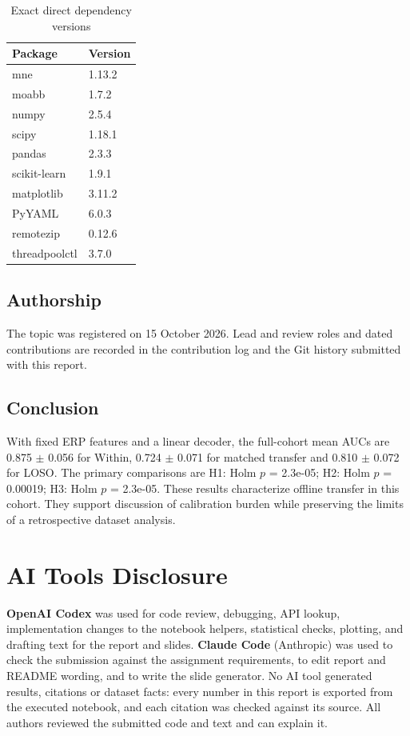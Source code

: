 \documentclass[conference]{IEEEtran}
\begin{document}
\begin{table}[!ht]\centering\caption{Exact direct dependency versions}\small
\begin{tabular}{ll}\toprule
Package & Version\\\midrule
mne & 1.13.2 \\
moabb & 1.7.2 \\
numpy & 2.5.4 \\
scipy & 1.18.1 \\
pandas & 2.3.3 \\
scikit-learn & 1.9.1 \\
matplotlib & 3.11.2 \\
PyYAML & 6.0.3 \\
remotezip & 0.12.6 \\
threadpoolctl & 3.7.0 \\
\bottomrule\end{tabular}\end{table}

\subsection{Authorship}
The topic was registered on 15 October 2026. Lead and review roles and dated
contributions are recorded in the contribution log and the Git history submitted with
this report.

\subsection{Conclusion}
With fixed ERP features and a linear decoder, the full-cohort mean AUCs are 0.875 $\pm$ 0.056
for Within, 0.724 $\pm$ 0.071 for matched transfer and 0.810 $\pm$ 0.072 for LOSO. The primary
comparisons are H1: Holm $p$ = 2.3e-05; H2: Holm $p$ = 0.00019; H3: Holm $p$ = 2.3e-05. These results characterize offline transfer in this
cohort. They support discussion of calibration burden while preserving the limits of
a retrospective dataset analysis.

\appendices
\section{AI Tools Disclosure}
\textbf{OpenAI Codex} was used for code review, debugging, API lookup, implementation
changes to the notebook helpers, statistical checks, plotting, and drafting text for
the report and slides. \textbf{Claude Code} (Anthropic) was used to check the
submission against the assignment requirements, to edit report and README wording,
and to write the slide generator.
No AI tool generated results, citations or dataset facts: every number in this report
is exported from the executed notebook, and each citation was checked against its
source. All authors reviewed the submitted code and text and can explain it.
\end{document}
